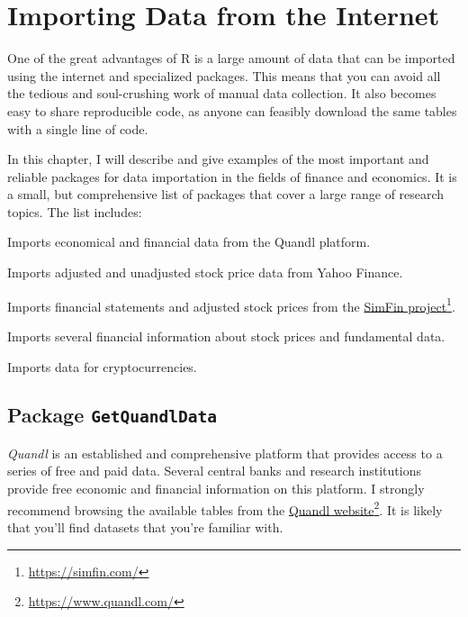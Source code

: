 \documentclass[
  12pt,
]{book}
\providecommand{\tightlist}{%
  \setlength{\itemsep}{0pt}\setlength{\parskip}{0pt}}
\begin{document}
\hypertarget{importing-internet}{%
\chapter{Importing Data from the Internet}\label{importing-internet}}

One of the great advantages of R is a large amount of data that can be imported using the internet and specialized packages. This means that you can avoid all the tedious and soul-crushing work of manual data collection. It also becomes easy to share reproducible code, as anyone can feasibly download the same tables with a single line of code.

In this chapter, I will describe and give examples of the most important and reliable packages for data importation in the fields of finance and economics. It is a small, but comprehensive list of packages that cover a large range of research topics. The list includes:

\begin{description}
\tightlist
\item[\texttt{GetQuandlData} \citep{R-GetQuandlData}]
Imports economical and financial data from the Quandl platform.
\item[\texttt{BatchGetSymbols} \citep{R-BatchGetSymbols}]
Imports adjusted and unadjusted stock price data from Yahoo Finance.
\item[\texttt{simfinR} \citep{R-simfinR}]
Imports financial statements and adjusted stock prices from the \href{https://simfin.com/}{SimFin project}\footnote{\url{https://simfin.com/}}.
\item[\texttt{tidyquant} \citep{R-tidyquant}]
Imports several financial information about stock prices and fundamental data.
\item[\texttt{Rbitcoin} \citep{R-Rbitcoin}]
Imports data for cryptocurrencies.
\end{description}

\hypertarget{quandl}{%
\section{\texorpdfstring{Package \texttt{GetQuandlData}}{Package GetQuandlData}}\label{quandl}}

\emph{Quandl} is an established and comprehensive platform that provides access to a series of free and paid data. Several central banks and research institutions provide free economic and financial information on this platform. I strongly recommend browsing the available tables from the \href{https://www.quandl.com/}{Quandl website}\footnote{\url{https://www.quandl.com/}}. It is likely that you'll find datasets that you're familiar with. 
\end{document}
